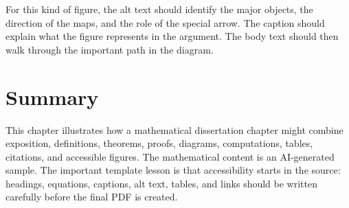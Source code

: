 For this kind of figure, the alt text should identify the major objects, the direction of the maps, and the role of the special arrow. The caption should explain what the figure represents in the argument. The body text should then walk through the important path in the diagram.

\section{Summary}
\label{sec:chapter-one-summary}

This chapter illustrates how a mathematical dissertation chapter might combine exposition, definitions, theorems, proofs, diagrams, computations, tables, citations, and accessible figures. The mathematical content is an AI-generated sample. The important template lesson is that accessibility starts in the source: headings, equations, captions, alt text, tables, and links should be written carefully before the final PDF is created.
